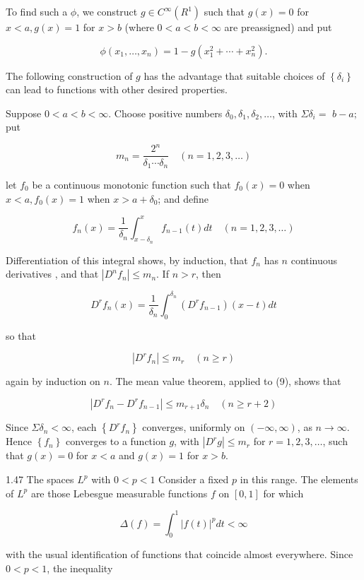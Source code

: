 \documentclass[10pt]{article}
\begin{document}
To find such a $\phi$, we construct $g \in C^{\infty}\left(R^{1}\right)$ such that $g(x)=0$ for $x<a, g(x)=1$ for $x>b$ (where $0<a<b<\infty$ are preassigned) and put

$$
\phi\left(x_{1}, \ldots, x_{n}\right)=1-g\left(x_{1}^{2}+\cdots+x_{n}^{2}\right) .
$$

The following construction of $g$ has the advantage that suitable choices of $\left\{\delta_{i}\right\}$ can lead to functions with other desired properties.

Suppose $0<a<b<\infty$. Choose positive numbers $\delta_{0}, \delta_{1}, \delta_{2}, \ldots$, with $\Sigma \delta_{i}=$ $b-a ;$ put

$$
m_{n}=\frac{2^{n}}{\delta_{1} \cdots \delta_{n}} \quad(n=1,2,3, \ldots)
$$

let $f_{0}$ be a continuous monotonic function such that $f_{0}(x)=0$ when $x<a, f_{0}(x)=1$ when $x>a+\delta_{0}$; and define

$$
f_{n}(x)=\frac{1}{\delta_{n}} \int_{x-\delta_{n}}^{x} f_{n-1}(t) d t \quad(n=1,2,3, \ldots)
$$

Differentiation of this integral shows, by induction, that $f_{n}$ has $n$ continuous derivatives , and that $\left|D^{n} f_{n}\right| \leq m_{n}$. If $n>r$, then

$$
D^{r} f_{n}(x)=\frac{1}{\delta_{n}} \int_{0}^{\delta_{n}}\left(D^{r} f_{n-1}\right)(x-t) d t
$$

so that

$$
\left|D^{r} f_{n}\right| \leq m_{r} \quad(n \geq r)
$$

again by induction on $n$. The mean value theorem, applied to (9), shows that

$$
\left|D^{r} f_{n}-D^{r} f_{n-1}\right| \leq m_{r+1} \delta_{n} \quad(n \geq r+2)
$$

Since $\Sigma \delta_{n}<\infty$, each $\left\{D^{r} f_{n}\right\}$ converges, uniformly on $(-\infty, \infty)$, as $n \rightarrow \infty$. Hence $\left\{f_{n}\right\}$ converges to a function $g$, with $\left|D^{r} g\right| \leq m_{r}$ for $r=1,2,3, \ldots$, such that $g(x)=0$ for $x<a$ and $g(x)=1$ for $x>b$.

1.47 The spaces $L^{p}$ with $0<p<1$ Consider a fixed $p$ in this range. The elements of $L^{p}$ are those Lebesgue measurable functions $f$ on $[0,1]$ for which

$$
\Delta(f)=\int_{0}^{1}|f(t)|^{p} d t<\infty
$$

with the usual identification of functions that coincide almost everywhere. Since $0<p<1$, the inequality
\end{document}
